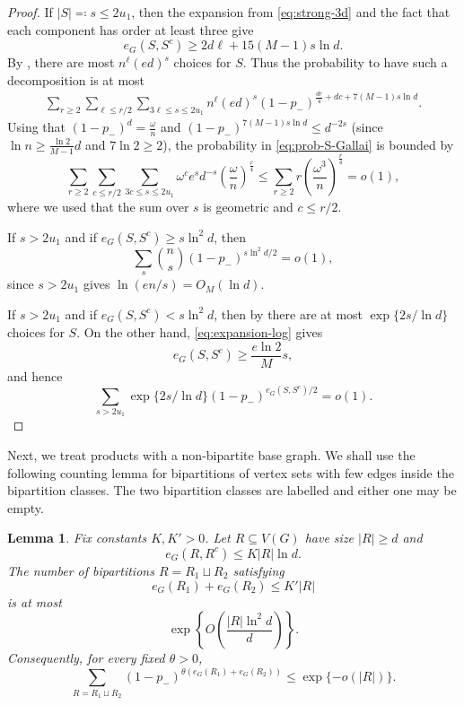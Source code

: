 \documentclass[10pt,a4paper]{article}
\newtheorem{lemma}[thm]{Lemma}
\begin{document}
\begin{proof}
If $|S|\eqqcolon s\le2u_1$, then the expansion from \eqref{eq:strong-3d} and the fact that each component has order at least three give
\[
 e_G(S,S^c)\ge 2d\ell+15(M-1) s \ln d.
\]
By , there are most $n^\ell(ed)^s$ choices for $S$.
Thus the probability to have such a decomposition is at most
\begin{align} \label{eq:prob-S-Gallai}
    \sum_{r\ge2}\sum_{\ell\le r/2}\sum_{3\ell\le s\le2u_1} n^\ell(ed)^s (1-p_-)^{\frac{dr}{4}+dc+7(M-1) s \ln d}.
\end{align}
Using that $(1-p_-)^d=\frac{\omega}{n}$ and $(1-p_-)^{7(M-1) s \ln d} \leq d^{-2s}$ (since $\ln n \geq \frac{\ln 2}{M-1} d$ and $7 \ln 2 \geq 2$), the probability in \eqref{eq:prob-S-Gallai} is bounded by
\[
\sum_{r\ge2}\sum_{c\le r/2}\sum_{3c\le s\le2u_1} \omega^c e^s d^{-s} \left(\frac{\omega}{n}\right)^{\frac{r}{4}} \leq \sum_{r \geq 2} r \left( \frac{\omega^3}{n}\right)^{\frac{r}{4}} = o(1),
\]
where we used that the sum over $s$ is geometric and $c \leq r/2$.

If $s>2u_1$ and if $e_G(S,S^c)\ge s\ln^2 d$, then
\[
 \sum_s \binom{n}{s} (1-p_-)^{s\ln^2 d/2}=o(1),
\]
since $s>2u_1$ gives $\ln(en/s)=O_M(\ln d)$.

If $s>2u_1$ and if $e_G(S,S^c)< s\ln^2 d$, then by  there are at most $\exp\{2s/\ln d\}$ choices for $S$.
On the other hand, \eqref{eq:expansion-log} gives
\[
 e_G(S,S^c)\ge\frac{e\ln 2}{M}s,
\]
and hence
\[
 \sum_{s>2u_1}\exp\{2s/\ln d\}(1-p_-)^{e_G(S,S^c)/2}=o(1).
\]
\end{proof}

Next, we treat products with a non-bipartite base graph.
We shall use the following counting lemma for bipartitions of vertex sets with few edges inside the bipartition classes. The two bipartition classes are labelled and either one may be empty.

\begin{lemma}
\label{lem:two-colour-count}
Fix constants $K, K'>0$.
Let $R\subseteq V(G)$ have size $|R|\ge d$ and
\[
 e_G(R,R^c)\le K |R|\ln d.
\]
The number of bipartitions $R=R_1\sqcup R_2$ satisfying
\[
 e_G(R_1)+e_G(R_2)\le K' |R|
\]
is at most
\[
 \exp\left\{O\left(\frac{|R|\ln^2 d}{d}\right)\right\}.
\]
Consequently, for every fixed $\theta>0$,
\begin{equation}\label{eq:colouring-weight}
 \sum_{R=R_1\sqcup R_2} (1-p_-)^{\theta(e_G(R_1)+e_G(R_2))}
 \le\exp\{-o(|R|)\}.
\end{equation}
\end{lemma}
\end{document}
